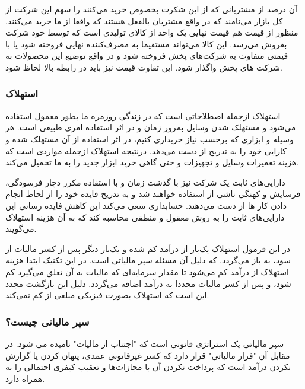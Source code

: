 \documentclass{CCI2020}
\begin{document}
آن درصد از مشتریانی که از این شکرت بخصوص خرید می‌کنند را سهم این شرکت از کل بازار می‌نامند که در واقع مشتریان بالفعل هستند که واقعا از ما خرید می‌کنند.
منظور از قیمت هم قیمت نهایی یک واحد از کالای تولیدی است که توسط خود شرکت بفروش می‌رسد. این کالا می‌تواند مستقیما به مصرف‌کننده نهایی فروخته شود یا با قیمتی متفاوت به شرکت‌های پخش فروخته شود و در واقع توضیع این محصولات به شرکت های پخش واگذار شود. این تفاوت قیمت نیز باید در رابطه بالا لحاظ شود.
\subsubsection{استهلاک}
استهلاک ازجمله اصطلاحاتی است که در زندگی روزمره ما بطور معمول استفاده می‌شود و مستهلک شدن وسایل بمرور زمان و در اثر استفاده امری طبیعی است. هر وسیله و ابزاری که برحسب نیاز خریداری کنیم، در اثر استفاده از آن مستهلک شده و کارایی خود را به تدریج از دست می‌دهد. درنتیجه استهلاک ازجمله مواردی است که هزینه تعمیرات وسایل و تجهیزات و حتی گاهی خرید ابزار جدید را به ما تحمیل می‌کند.

دارایی‌های ثابت یک شرکت نیز با گذشت زمان و با استفاده مکرر دچار فرسودگی، فرسایش و کهنگی ناشی از استفاده خواهند شد و به تدریج فایده خود را از لحاظ انجام دادن کار ها از دست می‌دهند.
حسابداری سعی می‌کند این کاهش فایده رسانی این دارایی‌های ثابت را به روش معقول و منطقی محاسبه کند که به آن هزینه استهلاک می‌گویند.

در این فرمول استهلاک یک‌بار از درآمد کم شده و یک‌بار دیگر پس از کسر مالیات از سود، به
باز می‌گردد. که دلیل آن مسئله سپر مالیاتی است. در این تکنیک ابتدا هزینه استهلاک از درآمد کم می‌شود تا مقدار سرمایه‌ای که مالیات به آن تعلق می‌گیرد کم شود، و پس از کسر مالیات مجددا به درآمد اضافه می‌گردد. دلیل این بازگشت مجدد این است که استهلاک بصورت فیزیکی مبلغی از 
کم نمی‌کند.
\cite{accountingtools.com/articles/2017/5/6/depreciation-expense}

\subsubsection{سپر مالیاتی چیست؟}
سپر مالیاتی یک استراتژی قانونی است که "اجتناب از مالیات" نامیده می شود. در مقابل آن "فرار مالیاتی"  قرار دارد که کسر غیرقانونی عمدی، پنهان کردن یا گزارش نکردن درآمد است که پرداخت نکردن آن با مجازات‌ها و تعقیب کیفری احتمالی را به همراه دارد.
 
\end{document}
